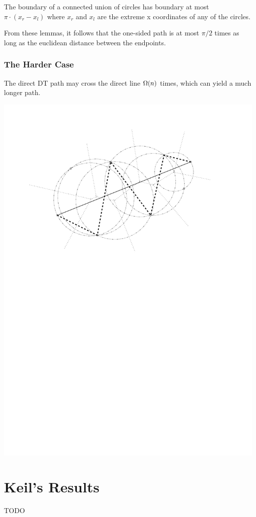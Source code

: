 \documentclass{tufte-handout}
\begin{document}
\begin{Lemma}

  The boundary of a connected union of circles has boundary at most
  $\pi \cdot (x_r - x_l)$ where $x_r$ and $x_l$ are the extreme x
  coordinates of any of the circles.
  
\end{Lemma}

From these lemmas, it follows that the one-sided path is at most
$\pi/2$ times as long as the euclidean distance between the endpoints.

\section{The Harder Case}

The direct DT path may cross the direct line $\Omega\!\left(n\right)$ times,
which can yield a much longer path.

\includegraphics[scale=0.75]{figures/two-sided_path.pdf}

\part{Keil's Results}

TODO


\newpage

\end{document}
